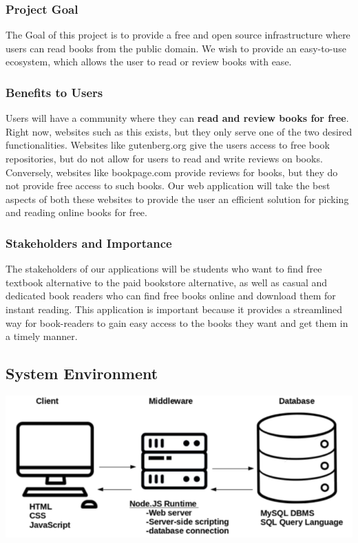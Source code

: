 \documentclass[letter, 12pt, titlepage]{article}
\begin{document}
	\subsubsection{Project Goal}
	The Goal of this project is to provide a free and open source infrastructure where users can read books from the public domain. We wish to provide an easy-to-use ecosystem, which allows the user to read or review books with ease.
	\subsubsection{Benefits to Users}
	Users will have a community where they can \textbf{read and review books for free}. Right now, websites such as this exists, but they only serve one of the two desired functionalities. Websites like gutenberg.org give the users access to free book repositories, but do not allow for users to read and write reviews on books. Conversely, websites like bookpage.com provide reviews for books, but they do not provide free access to such books. Our web application will take the best aspects of both these websites to provide the user an efficient solution for picking and reading online books for free.
    \subsubsection{Stakeholders and Importance}
    The stakeholders of our applications will be students who want to find free textbook alternative to the paid bookstore alternative, as well as casual and dedicated book readers who can find free books online and download them for instant reading. This application is important because it provides a streamlined way for book-readers to gain easy access to the books they want and get them in a timely manner.


\subsection{System Environment}
	
			\includegraphics[scale=.66]{3-tier.png}
\end{document}

